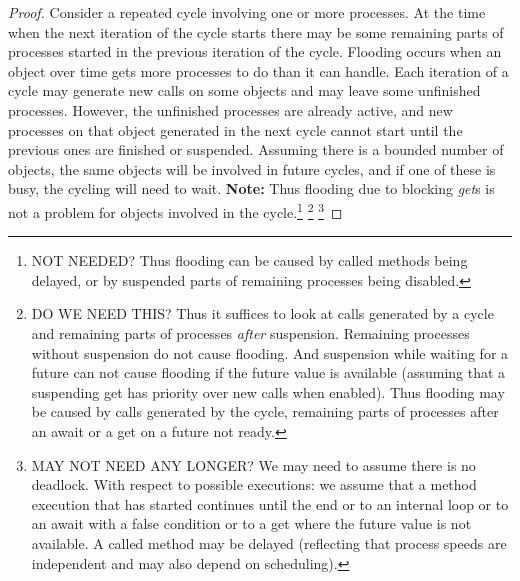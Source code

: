 {\begin{proof}
Consider a repeated cycle involving one or more processes.
At the time when the next iteration of the cycle starts there may be some remaining parts
of processes started in the previous  iteration of the  cycle. 
Flooding occurs when an object over time gets more processes to do  
than it can handle. Each iteration of a cycle may
generate new calls on some objects and may leave some unfinished
processes. However, the unfinished processes are already active,
and new processes on that object  generated in  the next cycle cannot start
until the previous ones are finished or suspended.
Assuming there is a bounded number of objects, the same objects will
be involved in  future cycles, and if one of these %
is busy, the cycling will need to wait.
\textbf{Note:} Thus flooding due to blocking \emph{get}s  is not a problem for objects
involved in the cycle.\footnote{
   NOT NEEDED?  Thus flooding can be caused by called methods
   being delayed, or by suspended parts of remaining processes
   being disabled.}%
\footnote{DO WE NEED THIS? 
   Thus it suffices to look at calls generated by a cycle and remaining
   parts of processes \emph{after} suspension.  Remaining processes without
   suspension do not cause flooding.  And suspension while waiting for
   a future can not cause flooding if the future value is available
   (assuming that a suspending get has priority over new calls when
   enabled).  Thus flooding may be caused by calls generated by the
   cycle, remaining parts of processes after an await or a get on a
   future not ready.  }%
\footnote{MAY NOT NEED ANY LONGER? We may need to assume there is no
  deadlock.  With respect to possible executions: we assume that a
  method execution that has started continues until the end or to an
  internal loop or to an await with a false condition or to a get
  where the future value is not available.  A called method may be
  delayed (reflecting that process speeds are independent and may also
  depend on scheduling).}
%
\end{proof}}
